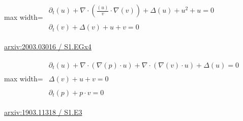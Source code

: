 \documentclass[UTF8,10pt,a4paper,fontset=mac]{ctexart}
\begin{document}
\begin{minipage}{\linewidth}\begin{center}\begin{adjustbox}{max width=\linewidth}$\displaystyle\begin{gathered}\begin{gathered}\partial_{t}(u)+\nabla\cdot(\frac{(u)}{v}\cdot \nabla(v))+\Delta(u)+u^{2}+u=0\end{gathered}\\[5pt]\begin{gathered}\partial_{t}(v)+\Delta(v)+u+v=0\end{gathered}\end{gathered}$\end{adjustbox}\end{center}{\small\href{https://arxiv.org/html/2003.03016#S1.EGx4}{arxiv:2003.03016 / S1.EGx4}}\par\end{minipage}\par\vspace{6mm}

\begin{minipage}{\linewidth}\begin{center}\begin{adjustbox}{max width=\linewidth}$\displaystyle\begin{gathered}\begin{gathered}\partial_{t}(u)+\nabla\cdot(\nabla(p)\cdot u)+\nabla\cdot(\nabla(v)\cdot u)+\Delta(u)=0\end{gathered}\\[5pt]\begin{gathered}\Delta(v)+u+v=0\end{gathered}\\[5pt]\begin{gathered}\partial_{t}(p)+p\cdot v=0\end{gathered}\end{gathered}$\end{adjustbox}\end{center}{\small\href{https://arxiv.org/html/1903.11318#S1.E3}{arxiv:1903.11318 / S1.E3}}\par\end{minipage}\par\vspace{6mm}
\end{document}
